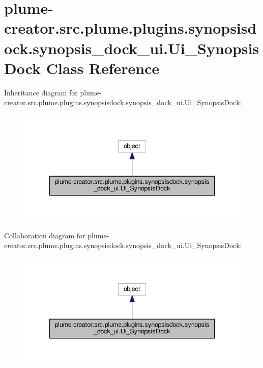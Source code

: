 \hypertarget{classplume-creator_1_1src_1_1plume_1_1plugins_1_1synopsisdock_1_1synopsis__dock__ui_1_1_ui___synopsis_dock}{}\section{plume-\/creator.src.\+plume.\+plugins.\+synopsisdock.\+synopsis\+\_\+dock\+\_\+ui.\+Ui\+\_\+\+Synopsis\+Dock Class Reference}
\label{classplume-creator_1_1src_1_1plume_1_1plugins_1_1synopsisdock_1_1synopsis__dock__ui_1_1_ui___synopsis_dock}


Inheritance diagram for plume-\/creator.src.\+plume.\+plugins.\+synopsisdock.\+synopsis\+\_\+dock\+\_\+ui.\+Ui\+\_\+\+Synopsis\+Dock\+:\nopagebreak
\begin{figure}[H]
\begin{center}
\leavevmode
\includegraphics[width=340pt]{classplume-creator_1_1src_1_1plume_1_1plugins_1_1synopsisdock_1_1synopsis__dock__ui_1_1_ui___synopsis_dock__inherit__graph}
\end{center}
\end{figure}


Collaboration diagram for plume-\/creator.src.\+plume.\+plugins.\+synopsisdock.\+synopsis\+\_\+dock\+\_\+ui.\+Ui\+\_\+\+Synopsis\+Dock\+:\nopagebreak
\begin{figure}[H]
\begin{center}
\leavevmode
\includegraphics[width=340pt]{classplume-creator_1_1src_1_1plume_1_1plugins_1_1synopsisdock_1_1synopsis__dock__ui_1_1_ui___synopsis_dock__coll__graph}
\end{center}
\end{figure}
